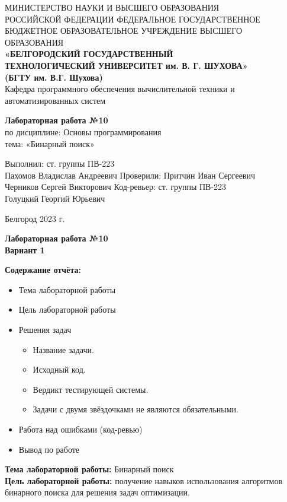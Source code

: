 \documentclass[a4paper,14pt]{extarticle}
\newcommand\textbox[1]{
    \parbox{.45\textwidth}{#1}
}
\newcommand{\header}[7]{
    \begin{center}
        \small{
            МИНИСТЕРСТВО НАУКИ И ВЫСШЕГО ОБРАЗОВАНИЯ \\РОССИЙСКОЙ ФЕДЕРАЦИИ
            \bigbreak
            ФЕДЕРАЛЬНОЕ ГОСУДАРСТВЕННОЕ БЮДЖЕТНОЕ ОБРАЗОВАТЕЛЬНОЕ УЧРЕЖДЕНИЕ ВЫСШЕГО ОБРАЗОВАНИЯ \\
            \bigbreak
            \textbf{«БЕЛГОРОДСКИЙ ГОСУДАРСТВЕННЫЙ \\ТЕХНОЛОГИЧЕСКИЙ УНИВЕРСИТЕТ им. В. Г. ШУХОВА»\\ (БГТУ им. В.Г. Шухова)} \\
            \bigbreak
            Кафедра программного обеспечения вычислительной техники и автоматизированных систем\\}
    \end{center}

    \vfill
    \begin{center}
        \large{
            \textbf{
                Лабораторная работа №#1 }}\\
        \normalsize{
            по дисциплине: #2 \\
            тема: «#3»}
    \end{center}
    \vfill
    \hfill\textbox{
        Выполнил: #4
        \bigbreak
        Проверили: #5
        \bigbreak
        Код-ревьер: #6
    }
    \vfill\begin{center}
              Белгород #7 г.
    \end{center}
    \newpage
}
\newcommand{\content}[4]{
    \justifying
    \begin{center}
        \large{
            \textbf{
                Лабораторная работа №#1
            }
        }\\
    \end{center}
    \textbf {
        Содержание отчёта:
    }
    #2
    \textbf{Тема лабораторной работы: }#3\\
    \textbf{Цель лабораторной работы: }#4
    \newpage
}
\begin{document}

    \header{10}{Основы программирования}{Бинарный поиск}{ст. группы ПВ-223\\Пахомов Владислав Андреевич}{Притчин Иван Сергеевич\\ Черников Сергей Викторович}{ст. группы ПВ-223\\ Голуцкий Георгий Юрьевич}{2023}
\content{10\\Вариант 1}{\begin{itemize}
    \item Тема лабораторной работы
\item Цель лабораторной работы
\item Решения задач
\begin{itemize}
    \item Название задачи.
\item Исходный код.
\item Вердикт тестирующей системы.
\item Задачи с двумя звёздочками не являются обязательными.

\end{itemize}
\item Работа над ошибками (код-ревью)
\item Вывод по работе

\end{itemize}}{Бинарный поиск}{получение навыков использования алгоритмов бинарного поиска для решения задач оптимизации.}
\end{document}
